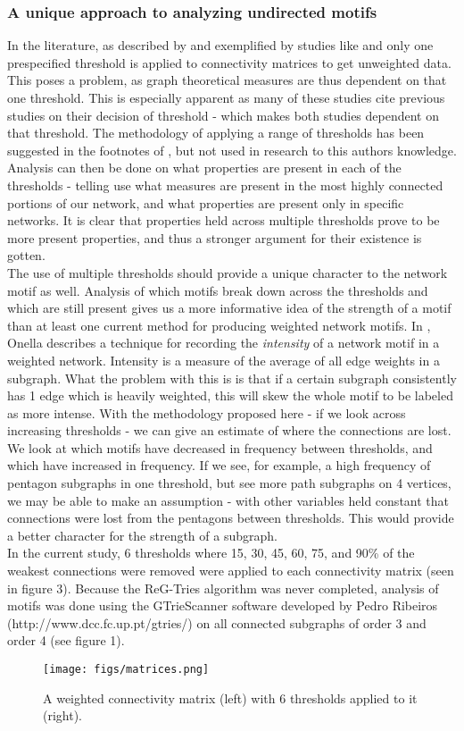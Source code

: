 \subsubsection{A unique approach to analyzing undirected motifs}
In the literature, as described by \cite{rubinov10} and exemplified by studies like \cite{deuker09} and \cite{wang09} only one prespecified threshold is applied to connectivity matrices to get unweighted data. This poses a problem, as graph theoretical measures are thus dependent on that one threshold. This is especially apparent as many of these studies cite previous studies on their decision of threshold - which makes both studies dependent on that threshold. The methodology of applying a range of thresholds has been suggested in the footnotes of \cite{sporns10}, but not used in research to this authors knowledge. Analysis can then be done on what properties are present in each of the thresholds - telling use what measures are present in the most highly connected portions of our network, and what properties are present only in specific networks. It is clear that properties held across multiple thresholds prove to be more present properties, and thus a stronger argument for their existence is gotten.\\
The use of multiple thresholds should provide a unique character to the network motif as well. Analysis of which motifs break down across the thresholds and which are still present gives us a more informative idea of the strength of a motif than at least one current method for producing weighted network motifs. In \cite{onella05}, Onella describes a technique for recording the \textit{intensity} of a network motif in a weighted network. Intensity is a measure of the average of all edge weights in a subgraph. What the problem with this is is that if a certain subgraph consistently has 1 edge which is heavily weighted, this will skew the whole motif to be labeled as more intense. With the methodology proposed here - if we look across increasing thresholds - we can give an estimate of where the connections are lost. We look at which motifs have decreased in frequency between thresholds, and which have increased in frequency. If we see, for example, a high frequency of pentagon subgraphs in one threshold, but see more path subgraphs on 4 vertices, we may be able to make an assumption - with other variables held constant that connections were lost from the pentagons between thresholds. This would provide a better character for the strength of a subgraph.\\
In the current study, 6 thresholds where 15, 30, 45, 60, 75, and 90\% of the weakest connections were removed were applied to each connectivity matrix (seen in figure 3).  
Because the ReG-Tries algorithm was never completed, analysis of motifs was done using the GTrieScanner software developed by Pedro Ribeiros (http://www.dcc.fc.up.pt/gtries/) on all connected subgraphs of order 3 and order 4 (see figure 1).
\begin{figure}
\texttt{[image: figs/matrices.png]}
\caption{A weighted connectivity matrix (left) with 6 thresholds applied to it (right).}
\end{figure}

